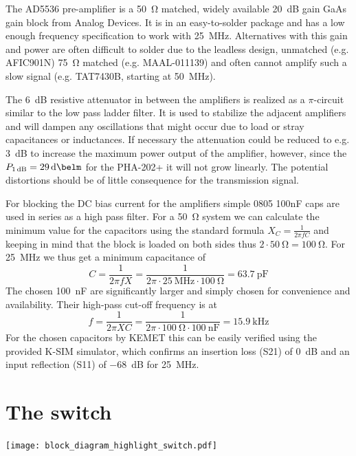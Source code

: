 The AD5536 pre-amplifier is a \qty{50}{\ohm} matched, widely available \qty{20}{\deci\bel} gain GaAs gain block from Analog Devices. It is in an easy-to-solder package and has a low enough frequency specification to work with \qty{25}{\mega\hertz}. Alternatives with this gain and power are often difficult to solder due to the leadless design, unmatched (e.g. AFIC901N) \qty{75}{\ohm} matched (e.g. MAAL-011139) and often cannot amplify such a slow signal (e.g. TAT7430B, starting at \qty{50}{\mega\hertz}).

The \qty{6}{\deci\bel} resistive attenuator in between the amplifiers is realized as a \(\pi\)-circuit similar to the low pass ladder filter. It is used to stabilize the adjacent amplifiers and will dampen any oscillations that might occur due to load or stray capacitances or inductances. If necessary the attenuation could be reduced to e.g. \qty{3}{\deci\bel} to increase the maximum power output of the amplifier, however, since the \(P_{\qty{1}{\deci\bel}} = \qty{29}{\deci\belm}\) for the PHA-202+ it will not grow linearly. The potential distortions should be of little consequence for the transmission signal.

For blocking the DC bias current for the amplifiers simple 0805 100nF caps are used in series as a high pass filter. For a \qty{50}{\ohm} system we can calculate the minimum value for the capacitors using the standard formula \(X_C = \frac{1}{2\pi{}fC}\) and keeping in mind that the block is loaded on both sides thus \( 2 \cdot \qty{50}{\ohm} = \qty{100}{\ohm}\). For \qty{25}{\mega\hertz} we thus get a minimum capacitance of
\[
    C = \frac{1}{2\pi{}fX} = \frac{1}{2\pi{} \cdot{} \qty{25}{\mega\hertz} \cdot{} \qty{100}{\ohm}} = \qty{63.7}{\pico\farad}
\]
The chosen \qty{100}{\nano\farad} are significantly larger and simply chosen for convenience and availability. Their high-pass cut-off frequency is at
\[
    f = \frac{1}{2\pi{}XC} = \frac{1}{2\pi{} \cdot{} \qty{100}{\ohm} \cdot{} \qty{100}{\nano\farad}} = \qty{15.9}{\kilo\hertz}
\]
For the chosen capacitors by KEMET this can be easily verified using the provided K-SIM simulator, which confirms an insertion loss (S21) of \qty{0}{\deci\bel} and an input reflection (S11) of \qty{-68}{\deci\bel} for \qty{25}{\mega\hertz}.


\section{The switch}
\begin{marginfigure}[-4.5\baselineskip]
    \texttt{[image: block\_diagram\_highlight\_switch.pdf]}
\end{marginfigure}

